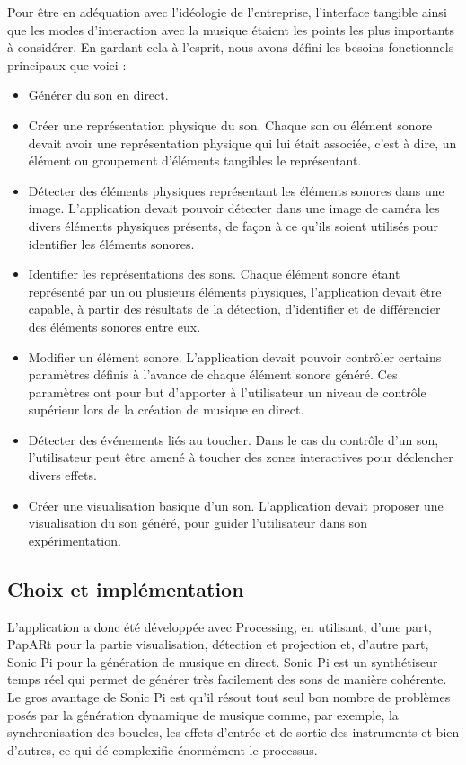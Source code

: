 Pour être en adéquation avec l'idéologie de l'entreprise, l'interface tangible ainsi que les modes d'interaction avec la musique étaient les points les plus importants à considérer. En gardant cela à l'esprit, nous avons défini les besoins fonctionnels principaux que voici :
\begin{itemize}
\item Générer du son en direct.
\item Créer une représentation physique du son. Chaque son ou élément sonore devait avoir une représentation physique qui lui était associée, c'est à dire, un élément ou groupement d'éléments tangibles le représentant.
\item Détecter des éléments physiques représentant les éléments sonores dans une image. L'application devait pouvoir détecter dans une image de caméra les divers éléments physiques présents, de façon à ce qu'ils soient utilisés pour identifier les éléments sonores.
\item Identifier les représentations des sons. Chaque élément sonore étant représenté par un ou plusieurs éléments physiques, l'application devait être capable, à partir des résultats de la détection, d'identifier et de différencier des éléments sonores entre eux. 
\item Modifier un élément sonore. L'application devait pouvoir contrôler certains paramètres définis à l'avance de chaque élément sonore généré. Ces paramètres ont pour but d'apporter à l'utilisateur un niveau de contrôle supérieur lors de la création de musique en direct.
\item Détecter des événements liés au toucher. Dans le cas du contrôle d'un son, l'utilisateur peut être amené à toucher des zones interactives pour déclencher divers effets.
\item Créer une visualisation basique d'un son. L'application devait proposer une visualisation du son généré, pour guider l'utilisateur dans son expérimentation.
\end{itemize}

\subsection{Choix et implémentation}
\label{subsec:reartable:impl}
L'application a donc été développée avec Processing, en utilisant, d'une part, PapARt pour la partie visualisation, détection et projection et, d'autre part, Sonic Pi\cite{sonicpi} pour la génération de musique en direct.
Sonic Pi est un synthétiseur temps réel qui permet de générer très facilement des sons de manière cohérente. Le gros avantage de Sonic Pi est qu'il résout tout seul bon nombre de problèmes posés par la génération dynamique de musique comme, par exemple, la synchronisation des boucles, les effets d'entrée et de sortie des instruments et bien d'autres, ce qui dé-complexifie énormément le processus.


